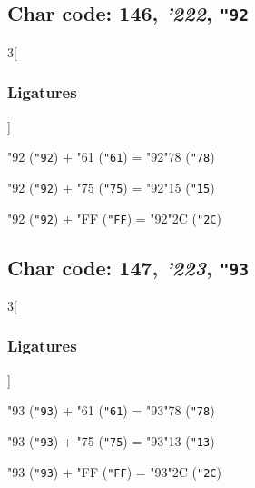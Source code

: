 \documentclass{article}
\newlength{\maxcharwidth}
\begin{document}
\subsection{Char code: 146, {\it'222}, {\tt"92}}
\label{char_146}


\begin{multicols}{3}[\subsubsection{Ligatures}]

{\testfont\char"92\noboundary} ({\tt"92}) + {\testfont\char"61\noboundary} ({\tt"61}) = {\testfont\char"92\noboundary}{\testfont\char"78\noboundary} ({\tt"78}) 

{\testfont\char"92\noboundary} ({\tt"92}) + {\testfont\char"75\noboundary} ({\tt"75}) = {\testfont\char"92\noboundary}{\testfont\char"15\noboundary} ({\tt"15}) 

{\testfont\char"92\noboundary} ({\tt"92}) + {\testfont\char"FF\noboundary} ({\tt"FF}) = {\testfont\char"92\noboundary}{\testfont\char"2C\noboundary} ({\tt"2C}) 

\end{multicols}

\subsection{Char code: 147, {\it'223}, {\tt"93}}
\label{char_147}


\begin{multicols}{3}[\subsubsection{Ligatures}]

{\testfont\char"93\noboundary} ({\tt"93}) + {\testfont\char"61\noboundary} ({\tt"61}) = {\testfont\char"93\noboundary}{\testfont\char"78\noboundary} ({\tt"78}) 

{\testfont\char"93\noboundary} ({\tt"93}) + {\testfont\char"75\noboundary} ({\tt"75}) = {\testfont\char"93\noboundary}{\testfont\char"13\noboundary} ({\tt"13}) 

{\testfont\char"93\noboundary} ({\tt"93}) + {\testfont\char"FF\noboundary} ({\tt"FF}) = {\testfont\char"93\noboundary}{\testfont\char"2C\noboundary} ({\tt"2C}) 

\end{multicols}
\end{document}
